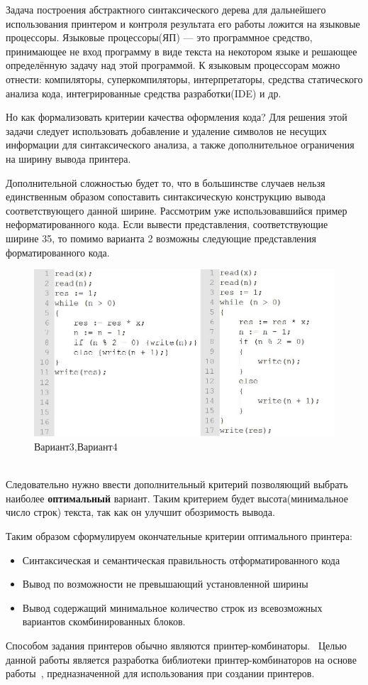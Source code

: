 \documentclass{matmex-diploma}
\begin{document}
Задача построения абстрактного синтаксического дерева для дальнейшего использования принтером и контроля результата его работы ложится на языковые процессоры. Языковые процессоры(ЯП) — это программное средство, принимающее не вход программу в виде текста на некотором языке и решающее определённую задачу над этой программой. К языковым процессорам можно отнести: компиляторы, суперкомпиляторы, интерпретаторы, средства статического анализа кода, интегрированные средства разработки(IDE) и др.

Но как формализовать критерии качества оформления кода?  Для решения этой задачи следует использовать добавление и удаление символов не несущих информации для синтаксического анализа, а также дополнительное ограничения на ширину вывода принтера.

Дополнительной сложностью будет то, что в большинстве случаев нельзя единственным образом сопоставить синтаксическую конструкцию вывода соответствующего данной ширине. Рассмотрим уже использовавшийся пример неформатированного кода. Если вывести представления, соответствующие ширине 35, то помимо варианта 2 возможны следующие представления форматированного кода.
\begin{figure}[h]
    \centering
    \includegraphics[scale=0.5]{Images/image08.png}
    \caption{Вариант3,Вариант4}
\end{figure}
\\Следовательно нужно ввести дополнительный критерий позволяющий выбрать наиболее \textbf{оптимальный} вариант. Таким критерием будет высота(минимальное число строк) текста, так как он улучшит обозримость вывода. 

Таким образом сформулируем окончательные критерии оптимального принтера:
\begin{itemize}
    \item Синтаксическая и семантическая правильность отформатированного кода
    \item Вывод по возможности не превышающий установленной ширины
    \item Вывод содержащий минимальное количество строк из всевозможных вариантов скомбинированных блоков.
\end{itemize}
Способом задания принтеров обычно являются принтер-комбинаторы.~\cite{podkopaevD, podkopaevR, printComb}
Целью данной работы является разработка библиотеки принтер-комбинаторов на основе работы~\cite{podkopaevD}, предназначенной для использования при создании принтеров.
\end{document}
